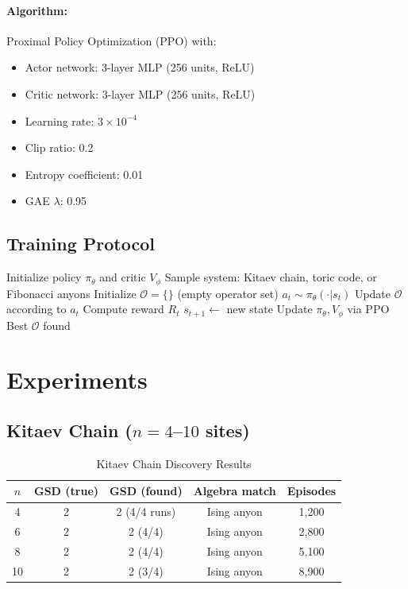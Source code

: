 \documentclass[neurips_2026]{neurips_2026}
\begin{document}
\paragraph{Algorithm:} Proximal Policy Optimization (PPO) \cite{Schulman2017} with:
\begin{itemize}
\item Actor network: 3-layer MLP (256 units, ReLU)
\item Critic network: 3-layer MLP (256 units, ReLU)
\item Learning rate: $3 \times 10^{-4}$
\item Clip ratio: 0.2
\item Entropy coefficient: 0.01
\item GAE $\lambda$: 0.95
\end{itemize}

\subsection{Training Protocol}

\begin{algorithm}[ht]
\caption{TopoRL: Topological Order Discovery}
\label{alg:toporl}
\begin{algorithmic}[1]
\State Initialize policy $\pi_\theta$ and critic $V_\phi$
  \State Sample system: Kitaev chain, toric code, or Fibonacci anyons
  \State Initialize $\mathcal{O} = \{\}$ (empty operator set)
    \State $a_t \sim \pi_\theta(\cdot | s_t)$ 
    \State Update $\mathcal{O}$ according to $a_t$
    \State Compute reward $R_t$
    \State $s_{t+1} \leftarrow$ new state
  \EndFor
  \State Update $\pi_\theta, V_\phi$ via PPO
\EndFor
\State \Return Best $\mathcal{O}$ found
\end{algorithmic}
\end{algorithm}

\section{Experiments}
\label{sec:experiments}

\subsection{Kitaev Chain ($n = 4$--$10$ sites)}

\begin{table}[ht]
\centering
\caption{Kitaev Chain Discovery Results}
\label{tab:kitaev}
\begin{tabular}{ccccc}
\toprule
$n$ & GSD (true) & GSD (found) & Algebra match & Episodes \\
\midrule
4 & 2 & 2 (4/4 runs) & Ising anyon & 1,200 \\
6 & 2 & 2 (4/4) & Ising anyon & 2,800 \\
8 & 2 & 2 (4/4) & Ising anyon & 5,100 \\
10 & 2 & 2 (3/4) & Ising anyon & 8,900 \\
\bottomrule
\end{tabular}
\end{table}
\end{document}
